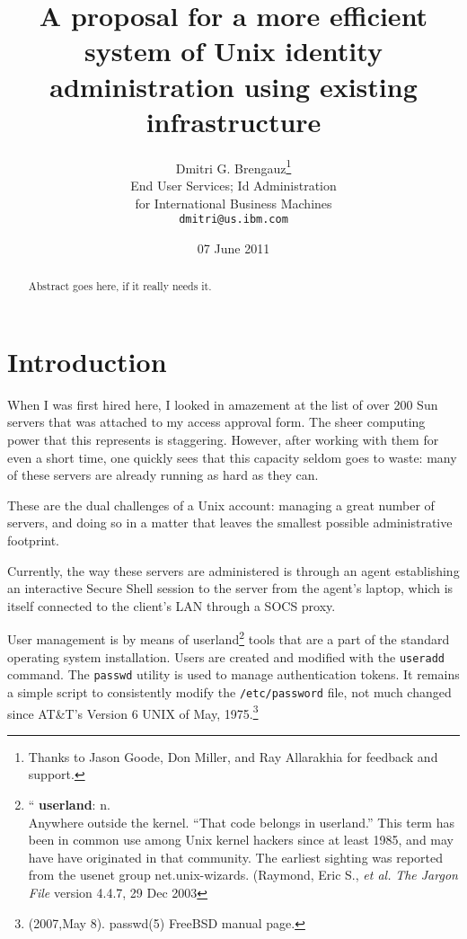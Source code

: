 \documentclass[12pt]{article}
\title{A proposal for a more efficient system of Unix identity
  administration using existing infrastructure}
\author{Dmitri G. Brengauz\thanks{Thanks to Jason Goode, Don Miller,
    and Ray Allarakhia for feedback and support.}\\
\small End User Services; Id Administration\\
\small for International Business Machines \\
\small \texttt{dmitri@us.ibm.com}\\
}
\date{07 June 2011}
\begin{document}
\maketitle

\begin{abstract}

Abstract goes here, if it really needs it.

\end{abstract}

\section{Introduction}

When I was first hired here, I looked in amazement at the list of over
200 Sun servers that  was attached to my access approval form.  The
sheer computing power that this represents is staggering.  However,
after working with them for even a short time, one quickly sees that
this  capacity seldom goes to waste:  many of these servers are
already running as hard as they can.


These are the dual challenges of a Unix account: managing a
great number of servers, and doing so in a matter that leaves the
smallest possible administrative footprint.  

Currently, the way these servers are administered is through an agent
establishing an interactive Secure Shell session to the server from
the agent's laptop, which is itself connected to the client's LAN
through a SOCS proxy.  

User management is by means of userland\footnote{`` \textbf{userland}:
  n.\\ Anywhere outside the kernel. ``That code belongs in userland.''
  This term has been in common use among Unix kernel hackers since at
  least 1985, and may have have originated in that community. The
  earliest sighting was reported from the usenet group
  net.unix-wizards. (Raymond, Eric S., \textit{et al.} \textit{The
    Jargon File} version 4.4.7, 29 Dec 2003}  tools that are a part of the standard
operating system installation.  Users are created and modified with
the \texttt{useradd} command.  The \texttt{passwd} utility is used to
manage authentication tokens.  It remains a simple script to
consistently modify the \texttt{/etc/password} file, not much changed
since AT\&T's Version 6 UNIX of May, 1975.\footnote{ (2007,May
  8). passwd(5) FreeBSD manual page.}
\end{document}
